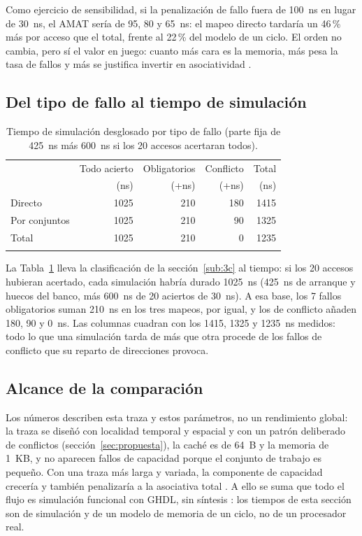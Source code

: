 \documentclass[llncs]{llncs}
\begin{document}
Como ejercicio de sensibilidad, si la penalización de fallo fuera de
100~ns en lugar de 30~ns, el AMAT sería de 95, 80 y 65~ns: el mapeo
directo tardaría un 46\,\% más por acceso que el total, frente al
22\,\% del modelo de un ciclo. El orden no cambia, pero sí el valor en
juego: cuanto más cara es la memoria, más pesa la tasa de fallos y más
se justifica invertir en asociatividad \cite{hennessy2019}.

\subsection{Del tipo de fallo al tiempo de simulación}

\begin{table}[t]
\centering
\small
\begin{tabular}{@{}lrrrr@{}}
\hline
\noalign{\smallskip}
 & Todo acierto & Obligatorios & Conflicto & Total \\
 & (ns) & (+ns) & (+ns) & (ns) \\
\noalign{\smallskip}\hline\noalign{\smallskip}
Directo & 1025 & 210 & 180 & 1415 \\
Por conjuntos & 1025 & 210 & 90 & 1325 \\
Total & 1025 & 210 & 0 & 1235 \\
\noalign{\smallskip}\hline
\end{tabular}
\caption{Tiempo de simulación desglosado por tipo de fallo (parte fija
de 425~ns más 600~ns si los 20 accesos acertaran todos).}
\label{tab:desglose}
\end{table}

La Tabla~\ref{tab:desglose} lleva la clasificación de la
sección~\ref{sub:3c} al tiempo: si los 20 accesos hubieran acertado,
cada simulación habría durado 1025~ns (425~ns de arranque y huecos del
banco, más 600~ns de 20 aciertos de 30~ns). A esa base, los 7 fallos
obligatorios suman 210~ns en los tres mapeos, por igual, y los de
conflicto añaden 180, 90 y 0~ns. Las columnas cuadran con los 1415,
1325 y 1235~ns medidos: todo lo que una simulación tarda de más que
otra procede de los fallos de conflicto que su reparto de direcciones
provoca.

\subsection{Alcance de la comparación}

Los números describen esta traza y estos parámetros, no un rendimiento
global: la traza se diseñó con localidad temporal y espacial y con un
patrón deliberado de conflictos (sección~\ref{sec:propuesta}), la caché
es de 64~B y la memoria de 1~KB, y no aparecen fallos de capacidad
porque el conjunto de trabajo es pequeño. Con una traza más larga y
variada, la componente de capacidad crecería y también penalizaría a la
asociativa total \cite{bryant2015,patterson2017}. A ello se suma que
todo el flujo es simulación funcional con GHDL, sin síntesis
\cite{ghdl-docs}: los tiempos de esta sección son de simulación y de
un modelo de memoria de un ciclo, no de un procesador real.
\end{document}
